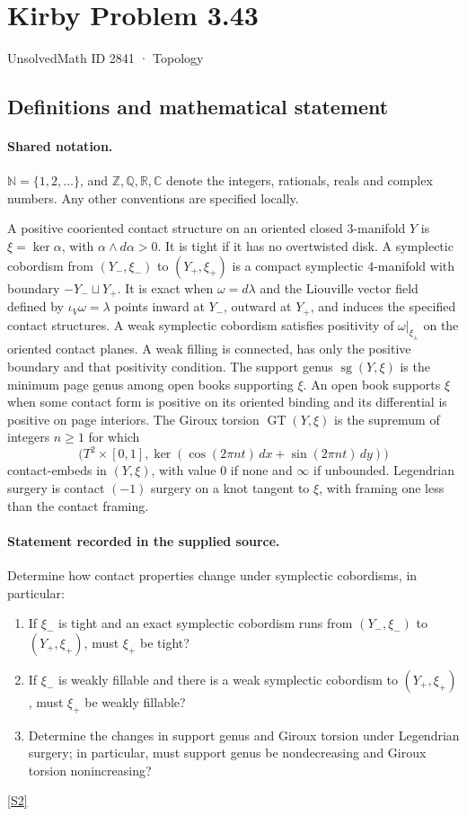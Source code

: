 \documentclass[11pt]{article}
\newcommand{\sref}[2]{\hyperlink{source:#1:#2}{[S#2]}}
\begin{document}
\setcounter{section}{2840}
\section{Kirby Problem 3.43}\label{2841}
{\small\sffamily UnsolvedMath ID 2841 · Topology}
\subsection{Definitions and mathematical statement}

\paragraph{Shared notation.}$\mathbb N=\{1,2,\ldots\}$, and $\mathbb Z,\mathbb Q,\mathbb R,\mathbb C$ denote the integers, rationals, reals and complex numbers. Any other conventions are specified locally.


A positive cooriented contact structure on an oriented closed $3$-manifold $Y$ is $\xi=\ker\alpha$, with $\alpha\wedge d\alpha>0$. It is tight if it has no overtwisted disk. A symplectic cobordism from $(Y_-,\xi_-)$ to $(Y_+,\xi_+)$ is a compact symplectic $4$-manifold with boundary $-Y_-\sqcup Y_+$. It is exact when $\omega=d\lambda$ and the Liouville vector field defined by $\iota_V\omega=\lambda$ points inward at $Y_-$, outward at $Y_+$, and induces the specified contact structures. A weak symplectic cobordism satisfies positivity of $\omega|_{\xi_\pm}$ on the oriented contact planes. A weak filling is connected, has only the positive boundary and that positivity condition.
The support genus $\operatorname{sg}(Y,\xi)$ is the minimum page genus among open books supporting $\xi$. An open book supports $\xi$ when some contact form is positive on its oriented binding and its differential is positive on page interiors. The Giroux torsion $\operatorname{GT}(Y,\xi)$ is the supremum of integers $n\ge1$ for which
\[
\bigl(T^2\times[0,1],\ker(\cos(2\pi nt)\,dx+\sin(2\pi nt)\,dy)\bigr)
\]
contact-embeds in $(Y,\xi)$, with value $0$ if none and $\infty$ if unbounded. Legendrian surgery is contact $(-1)$ surgery on a knot tangent to $\xi$, with framing one less than the contact framing.
\paragraph{Statement recorded in the supplied source.}
Determine how contact properties change under symplectic cobordisms, in particular:
\begin{enumerate}
\item If $\xi_-$ is tight and an exact symplectic cobordism runs from $(Y_-,\xi_-)$ to $(Y_+,\xi_+)$, must $\xi_+$ be tight?
\item If $\xi_-$ is weakly fillable and there is a weak symplectic cobordism to $(Y_+,\xi_+)$, must $\xi_+$ be weakly fillable?
\item Determine the changes in support genus and Giroux torsion under Legendrian surgery; in particular, must support genus be nondecreasing and Giroux torsion nonincreasing?
\end{enumerate}
\sref{2841}{2}
\end{document}
